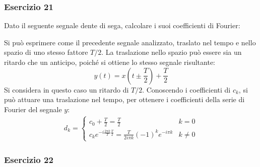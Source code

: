 \documentclass{article}
\begin{document}
\subsubsection*{Esercizio 21}

Dato il seguente segnale dente di sega, calcolare i suoi coefficienti di Fourier:
\begin{center}
\end{center}
Si può esprimere come il precedente segnale analizzato, traslato nel tempo e nello spazio di uno stesso fattore $T/2$. La traslazione nello spazio può essere sia un ritardo 
che un anticipo, poiché si ottiene lo stesso segnale risultante:
\begin{equation*}
    y(t)=x\left(t\pm\frac{T}{2}\right)+\displaystyle\frac{T}{2}
\end{equation*}
Si considera in questo caso un ritardo di $T/2$. Conoscendo i coefficienti di $c_k$, si può attuare una traslazione nel tempo, per ottenere i coefficienti della serie di Fourier 
del segnale $y$:
\begin{gather}
    d_k=\begin{cases}
        \displaystyle c_0+\frac{T}{2}=\frac{T}{2} &k=0\\
        c_ke^{-i\frac{2\pi k}{T}\frac{T}{2}}=\displaystyle\frac{T}{2i\pi k}(-1)^ke^{-i\pi k}&k\neq0
    \end{cases}
\end{gather}

\subsubsection*{Esercizio 22}
\end{document}
